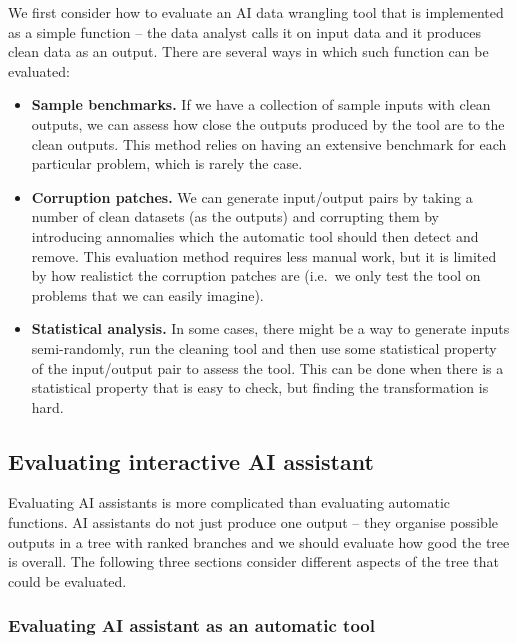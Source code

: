\documentclass{article}
\begin{document}
We first consider how to evaluate an AI data wrangling tool that is implemented as a simple 
function -- the data analyst calls it on input data and it produces clean data as an output.
There are several ways in which such function can be evaluated:
%
\begin{itemize}
\item \textbf{Sample benchmarks.} If we have a collection of sample inputs with clean outputs,
  we can assess how close the outputs produced by the tool are to the clean outputs. This method
  relies on having an extensive benchmark for each particular problem, which is rarely the case.
\item \textbf{Corruption patches.} We can generate input/output pairs by taking 
  a number of clean datasets (as the outputs) and corrupting them by introducing
  annomalies which the automatic tool should then detect and remove. This evaluation method requires 
  less manual work, but it is limited by how realistict the corruption patches are (i.e.~we only
  test the tool on problems that we can easily imagine).
\item \textbf{Statistical analysis.} In some cases, there might be a way to generate inputs 
  semi-randomly, run the cleaning tool and then use some statistical property of the input/output
  pair to assess the tool. This can be done when there is a statistical property that is easy
  to check, but finding the transformation is hard.
\end{itemize}

\subsection{Evaluating interactive AI assistant}

Evaluating AI assistants is more complicated than evaluating automatic functions.
AI assistants do not just produce one output -- they organise possible outputs in a tree with 
ranked branches and we should evaluate how good the tree is overall. The following three 
sections consider different aspects of the tree that could be evaluated.

\subsubsection{Evaluating AI assistant as an automatic tool}
\end{document}
